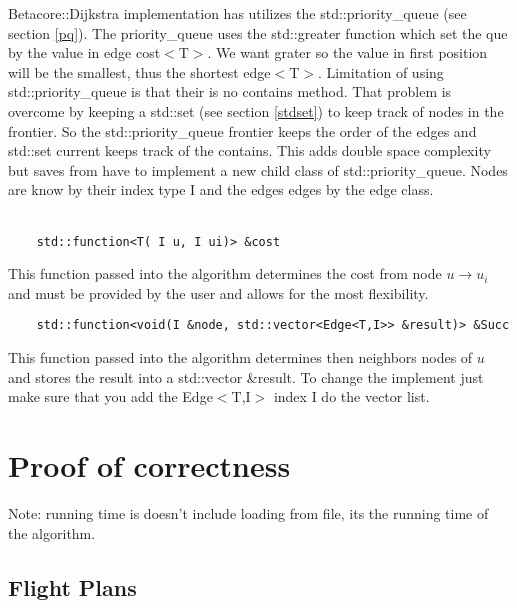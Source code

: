 \documentclass[12pt]{article}
\begin{document}
Betacore::Dijkstra implementation has utilizes the std::priority\_queue (see section \ref{pq}).
The priority\_queue uses the std::greater function which set the que by the value in edge cost$<$T$>$. We want grater
so the value in first position will be the smallest, thus the shortest edge$<$T$>$. 
Limitation of using std::priority\_queue is that their is no contains method. That 
problem is overcome by keeping a std::set (see section \ref{stdset}) to keep track of nodes in the frontier.
So the std::priority\_queue frontier keeps the order of the edges and std::set current keeps track of the contains.
This adds double space complexity but saves from have to implement a new child class of std::priority\_queue. Nodes 
are know by their index type I and the edges edges by the edge class.
\\
\\
\begin{lstlisting}
	std::function<T( I u, I ui)> &cost
\end{lstlisting}
This function passed into the algorithm determines the cost from node $u \to u_i$ and 
must be provided by the user and allows for the most flexibility.
\\
\begin{lstlisting}
	std::function<void(I &node, std::vector<Edge<T,I>> &result)> &Succ
\end{lstlisting}
This function passed into the algorithm determines then neighbors nodes of $u$ and
stores the result into a std::vector \&result. To change the implement just make sure
that you add the Edge$<$T,I$>$ index I do the vector list.

\section{Proof of correctness}
Note: running time is doesn't include loading from file, its the running time of the algorithm.
\subsection{Flight Plans}
\end{document}
